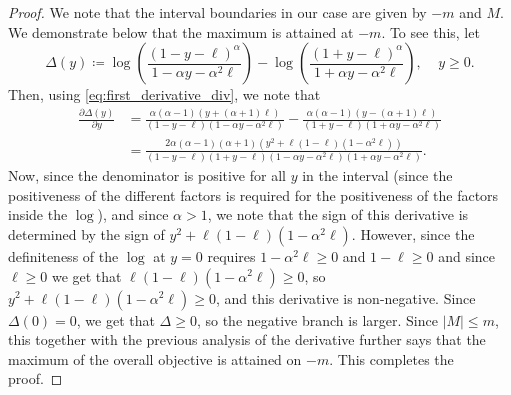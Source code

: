 \documentclass[11pt]{article}
\theoremstyle{definition}
\theoremstyle{plain}
\newcommand{\abs}[1]{\left| #1 \right|}
\begin{document}
\begin{proof}
We note that the interval boundaries in our case are given by $-m$ and $M$.
We demonstrate below that the maximum is attained at \(-m\).
To see this, let
 \begin{equation}
     \Delta(y)\coloneq \log\left(\frac{\left(1 - y - \ell\right)^{\alpha}}{1 - \alpha y - \alpha^2 \ell}\right) - \log\left(\frac{\left(1 + y - \ell\right)^{\alpha}}{1 + \alpha y - \alpha^2 \ell}\right),\ \ \ \ \ y\geq 0.
 \end{equation}
 Then, using \eqref{eq:first_derivative_div}, we note that 
 \begin{align}
     \frac{\partial\Delta(y)}{\partial y} &= \frac{\alpha(\alpha - 1)\left(y + (\alpha + 1)\ell\right)}{(1-y-\ell)(1 - \alpha y - \alpha^2 \ell)} -  \frac{\alpha(\alpha - 1)\left(y - (\alpha + 1)\ell\right)}{(1+y-\ell)(1 + \alpha y - \alpha^2\ell)}\\
     &= \frac{2\alpha(\alpha-1)(\alpha+1)\left(y^2+\ell(1 - \ell)(1 - \alpha^2 \ell)\right)}{(1-y-\ell)(1+y-\ell)(1-\alpha y-\alpha^2 \ell)(1+\alpha y-\alpha^2 \ell)}.
 \end{align}
Now, since the denominator is positive for all $y$ in the interval (since the positiveness of the different factors is required for the positiveness of the factors inside the $\log$), and since $\alpha > 1$, we note that the sign of this derivative is determined by the sign of $y^2 + \ell(1 - \ell)(1 - \alpha^2 \ell)$. However, since the definiteness of the $\log$ at $y = 0$ requires $1 - \alpha^2 \ell \geq 0$ and $1 - \ell \geq 0$ and since $\ell\geq 0$ we get that $\ell(1 - \ell)(1 - \alpha^2 \ell) \geq 0$, so $y^2 + \ell(1 - \ell)(1 - \alpha^2 \ell) \geq 0$, and this derivative is non-negative. Since $\Delta(0) = 0$, we get that $\Delta \geq 0$, so the negative branch is larger. Since $\abs{M} \leq m$, this together with the previous analysis of the derivative further says that the maximum of the overall objective is attained on $-m$. This completes the proof.
\end{proof}
\end{document}
